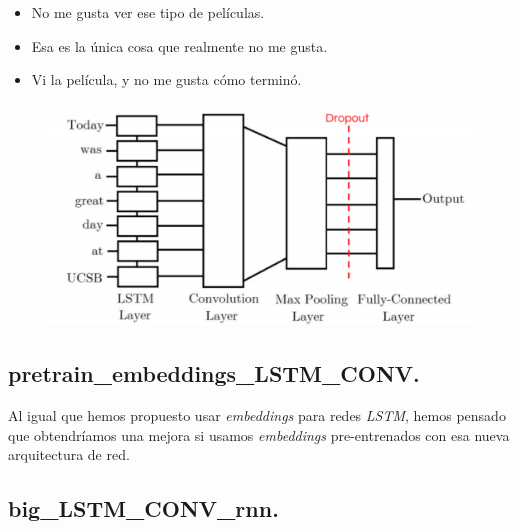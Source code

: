 \documentclass[11pt]{article}
\begin{document}
\begin{itemize}
    \item No me gusta ver ese tipo de películas.
    \item Esa es la única cosa que realmente no me gusta.
    \item Vi la película, y no me gusta cómo terminó.
\end{itemize}

\begin{figure}[H]
\centering
\includegraphics[width=0.5\linewidth]{images/lstm-cnn-konukoii-1024x535.png}
\end{figure}



\subsection{pretrain\_embeddings\_LSTM\_CONV.}

Al igual que hemos propuesto usar \textit{embeddings} para redes \textit{LSTM}, hemos pensado que obtendríamos una mejora si usamos \textit{embeddings} pre-entrenados con esa nueva arquitectura de red.

\label{pretrainembeddingsLSTMCONV}


\subsection{big\_LSTM\_CONV\_rnn.} \label{bigLSTMCONVrnn}
\end{document}
